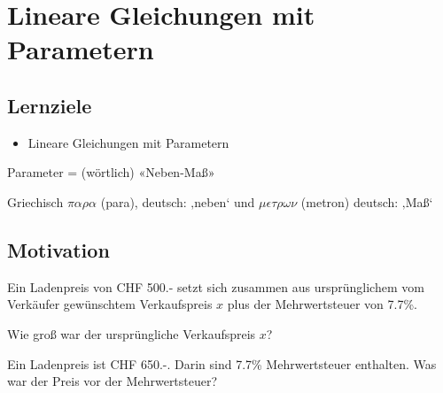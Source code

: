 
\section{Lineare Gleichungen mit Parametern}
\subsection*{Lernziele}

\begin{itemize}
\item Lineare Gleichungen mit Parametern
\end{itemize}

Parameter = (wörtlich) «Neben-Maß»

Griechisch $\pi\alpha\rho\alpha$ (para), deutsch: ‚neben‘ und $\mu\epsilon\tau\rho\omega\nu$ (metron) deutsch: ‚Maß‘

\newpage
\subsection{Motivation}
Ein Ladenpreis von CHF 500.- setzt sich zusammen aus ursprünglichem
vom Verkäufer gewünschtem Verkaufspreis $x$ plus der Mehrwertsteuer von 7.7\%.

Wie groß war der ursprüngliche Verkaufspreis $x$?


Ein Ladenpreis ist CHF 650.-. Darin sind 7.7\% Mehrwertsteuer
enthalten. Was war der Preis vor der Mehrwertsteuer?


